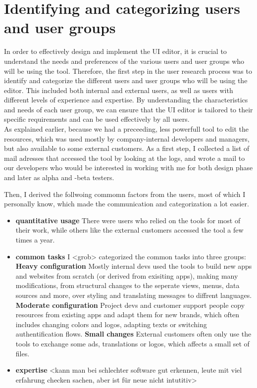 \section{Identifying and categorizing users and user groups}

In order to effectively design and implement the UI editor, it is crucial to understand the needs and preferences of the various users and user groups who will be using the tool.
Therefore, the first step in the user research process was to identify and categorize the different users and user groups who will be using the editor.
This included both internal and external users, as well as users with different levels of experience and expertise. By understanding the characteristics and needs of each user group, we can ensure that the UI editor is tailored to their specific requirements and can be used effectively by all users.
\\
As explained earlier, because we had a preceeding, less powerfull tool to edit the resources, which was used mostly by company-internal developers and managers,
but also available to some external customers. As a first step, I collected a list of mail adresses that accessed the tool by looking at the logs, and wrote a mail to our developers who would be interested in working with me for both design phase and later as alpha and -beta testers.

Then, I derived the follwoing commomn factors from the users, most of which I personally know, which made the communication and categorization a lot easier.

\begin{itemize}
  \item \textbf{quantitative usage} There were users who relied on the tools for most of their work, while others like the external customers accessed the tool a few times a year.
  \item \textbf{common tasks} I <grob> categorized the common tasks into three groups:
    \subitem \textbf{Heavy configuration} Mostly internal devs used the tools to build new apps and websites from scratch (or derived from exisiting apps), making many modifications, from structural changes to the seperate views, menus, data sources and more, over styling and translating messages to diffrent languages.
    \subitem \textbf{Moderate configuration} Project devs and customer support people copy resources from existing apps and adapt them for new brands, which often includes changing colors and logos, adapting texts or switching authentification flows.
    \subitem \textbf{Small changes} External customers often only use the tools to exchange some ads, translations or logos, which affects a small set of files.
  \item \textbf{expertise} <kann man bei schlechter software gut erkennen, leute mit viel erfahrung checken sachen, aber ist für neue nicht intutitiv>
\end{itemize}

